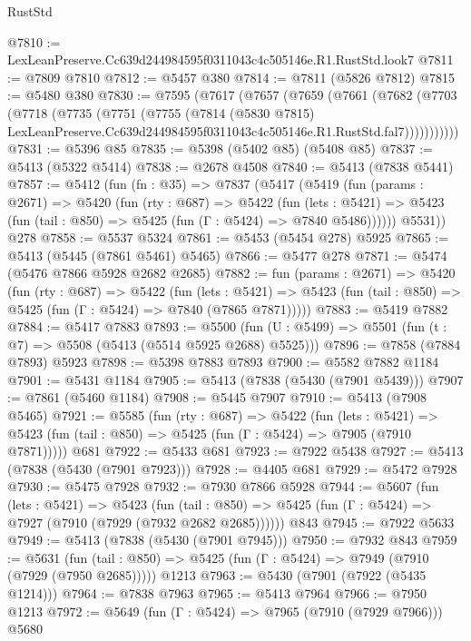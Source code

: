 \begin{lexlean}{RustStd}
\begin{coremodule}
@7810 := LexLeanPreserve.Cc639d244984595f0311043c4c505146e.R1.RustStd.look7
@7811 := @7809 @7810
@7812 := @5457 @380
@7814 := @7811 (@5826 @7812)
@7815 := @5480 @380
@7830 := @7595
    (@7617
      (@7657
        (@7659
          (@7661
            (@7682
              (@7703
                (@7718
                  (@7735
                    (@7751
                      (@7755
                        (@7814
                          (@5830 @7815)
                          LexLeanPreserve.Cc639d244984595f0311043c4c505146e.R1.RustStd.fal7)))))))))))
@7831 := @5396 @85
@7835 := @5398 (@5402 @85) (@5408 @85)
@7837 := @5413 (@5322 @5414)
@7838 := @2678 @4508
@7840 := @5413 (@7838 @5441)
@7857 := @5412
    (fun (fn : @35) =>
    @7837
      (@5417
        (@5419
          (fun (params : @2671) =>
          @5420
            (fun (rty : @687) =>
            @5422
              (fun (lets : @5421) =>
              @5423 (fun (tail : @850) => @5425 (fun (Γ : @5424) => @7840 @5486))))))
        @5531))
    @278
@7858 := @5537 @5324
@7861 := @5453 (@5454 @278) @5925
@7865 := @5413 (@5445 (@7861 @5461) @5465)
@7866 := @5477 @278
@7871 := @5474 (@5476 @7866 @5928 @2682 @2685)
@7882 := fun (params : @2671) =>
  @5420
    (fun (rty : @687) =>
    @5422
      (fun (lets : @5421) =>
      @5423 (fun (tail : @850) => @5425 (fun (Γ : @5424) => @7840 (@7865 @7871)))))
@7883 := @5419 @7882
@7884 := @5417 @7883
@7893 := @5500 (fun (U : @5499) => @5501 (fun (t : @7) => @5508 (@5413 (@5514 @5925 @2688) @5525)))
@7896 := @7858 (@7884 @7893) @5923
@7898 := @5398 @7883 @7893
@7900 := @5582 @7882 @1184
@7901 := @5431 @1184
@7905 := @5413 (@7838 (@5430 (@7901 @5439)))
@7907 := @7861 (@5460 @1184)
@7908 := @5445 @7907
@7910 := @5413 (@7908 @5465)
@7921 := @5585
    (fun (rty : @687) =>
    @5422
      (fun (lets : @5421) =>
      @5423 (fun (tail : @850) => @5425 (fun (Γ : @5424) => @7905 (@7910 @7871)))))
    @681
@7922 := @5433 @681
@7923 := @7922 @5438
@7927 := @5413 (@7838 (@5430 (@7901 @7923)))
@7928 := @4405 @681
@7929 := @5472 @7928
@7930 := @5475 @7928
@7932 := @7930 @7866 @5928
@7944 := @5607
    (fun (lets : @5421) =>
    @5423
      (fun (tail : @850) => @5425 (fun (Γ : @5424) => @7927 (@7910 (@7929 (@7932 @2682 @2685))))))
    @843
@7945 := @7922 @5633
@7949 := @5413 (@7838 (@5430 (@7901 @7945)))
@7950 := @7932 @843
@7959 := @5631
    (fun (tail : @850) => @5425 (fun (Γ : @5424) => @7949 (@7910 (@7929 (@7950 @2685)))))
    @1213
@7963 := @5430 (@7901 (@7922 (@5435 @1214)))
@7964 := @7838 @7963
@7965 := @5413 @7964
@7966 := @7950 @1213
@7972 := @5649 (fun (Γ : @5424) => @7965 (@7910 (@7929 @7966))) @5680

\end{coremodule}
\end{lexlean}
